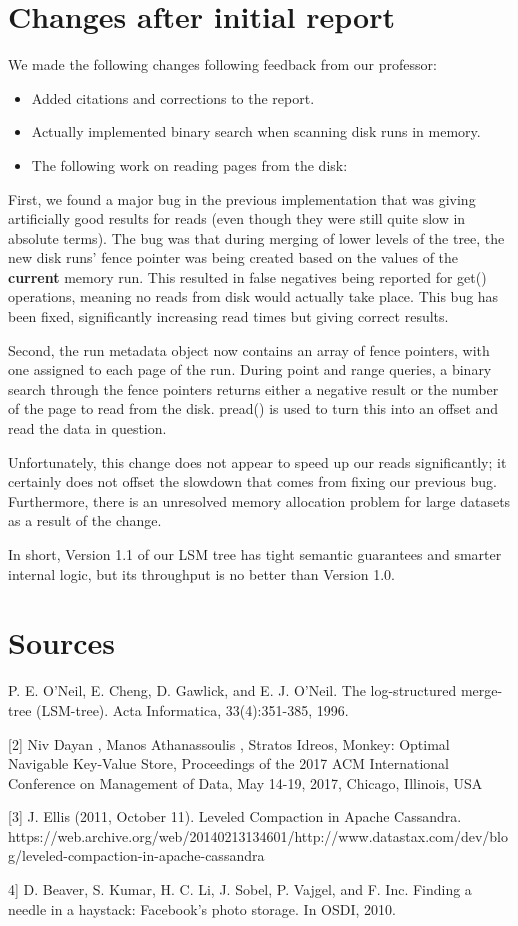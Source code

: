 \documentclass[12pt]{article}
\begin{document}
\section{Changes after initial report}

\indent \indent We made the following changes following feedback from our professor:

\begin{itemize}
\item Added citations and corrections to the report.
\item Actually implemented binary search when scanning disk runs in memory.
\item The following work on reading pages from the disk:
\end{itemize}

First, we found a major bug in the previous implementation that was giving artificially good results for reads (even though they were still quite slow in absolute terms). The bug was that during merging of lower levels of the tree, the new disk runs' fence pointer was being created based on the values of the \textbf{current} memory run. This resulted in false negatives being reported for get() operations, meaning no reads from disk would actually take place. This bug has been fixed, significantly increasing read times but giving correct results.

Second, the run metadata object now contains an array of fence pointers, with one assigned to each page of the run. During point and range queries, a binary search through the fence pointers returns either a negative result or the number of the page to read from the disk. pread() is used to turn this into an offset and read the data in question.

Unfortunately, this change does not appear to speed up our reads significantly; it certainly does not offset the slowdown that comes from fixing our previous bug. Furthermore, there is an unresolved memory allocation problem for large datasets as a result of the change.

In short, Version 1.1 of our LSM tree has tight semantic guarantees and smarter internal logic, but its throughput is no better than Version 1.0.

\section*{Sources}
\indent \indent [1] P. E. O'Neil, E. Cheng, D. Gawlick, and E. J. O'Neil. The
log-structured merge-tree (LSM-tree). Acta Informatica,
33(4):351-385, 1996.

[2] Niv Dayan , Manos Athanassoulis , Stratos Idreos, Monkey: Optimal Navigable Key-Value Store, Proceedings of the 2017 ACM International Conference on Management of Data, May 14-19, 2017, Chicago, Illinois, USA

[3] J. Ellis (2011, October 11). Leveled Compaction in Apache Cassandra. https://web.archive.org/web/20140213134601/http://www.datastax.com/dev/blog/leveled-compaction-in-apache-cassandra 

4] D. Beaver, S. Kumar, H. C. Li, J. Sobel, P. Vajgel, and F. Inc. Finding a needle in a haystack: Facebook's photo storage. In OSDI, 2010.
\end{document}
